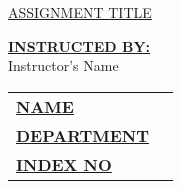 \documentclass[12pt,a4paper]{article}
\begin{document}
\begin{titlepage}
	
	\begin{flushright}
		\textbf{\uppercase{\fontsize{12}{18} \selectfont {Assignment No: 01}}}
	\end{flushright}
	
	\vspace*{\fill}
	\begin{center}
		\uppercase{\fontsize{30}{45}\selectfont \ul{Assignment Title}}
	\end{center}
	\vfill %
	\begin{multicols}{2}
		\noindent\textbf{\underline{INSTRUCTED BY:}} \\Instructor's Name
		
		\columnbreak	
		\begin{tabular}{ll}
			\vspace{6pt}
			
			\textbf{\uppercase{\underline{Name}}}       &
			\textbf{\uppercase{\fontsize{12}{18} \selectfont {:}}} 
			{\fontsize{12}{18} \selectfont {<Name>}}      \\
			
			\vspace{6pt}
			\textbf{\uppercase{\underline{Department}}} &
			\textbf{\uppercase{\fontsize{12}{18} \selectfont {:}}} 
			{\fontsize{12}{18} \selectfont {<Department>}}\\
			
			\vspace{6pt}
			\textbf{\uppercase{\underline{Index No}}}   &
			\textbf{\uppercase{\fontsize{12}{18} \selectfont {:}}} 
			{\fontsize{12}{18} \selectfont {<Index No>}}  \\

			
			
		\end{tabular}
	\end{multicols}
	
\end{titlepage}


\tableofcontents
\newpage
{}
\setcounter{page}{1}
\end{document}
